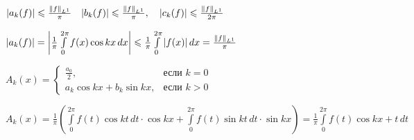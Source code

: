\begin{remark}\thmslashn
	
	$|a_k(f)| \leqslant\frac{\left\|f\right\|_{L^1}}{\pi} \quad |b_k(f)| \leqslant \frac{\left\|f\right\|_{L^1}}{\pi}, \quad |c_k(f)| \leqslant \frac{\left\|f\right\|_{L^1}}{2\pi}$
	
	$|a_k(f)| = \left| \frac{1}{\pi} \int\limits_{0}^{2\pi} f(x) \cos kx \,dx\right| \leqslant  \frac{1}{\pi} \int\limits_{0}^{2\pi} |f(x)| \,dx = \frac{\left\|f\right\|_{L^1}}{\pi}$
	
\end{remark}

\begin{designations}\thmslashn
	
	$A_k(x) = \begin{cases}
	\frac{a_0}{2}, & \text{если } k = 0\\
	a_k \cos kx + b_k \sin kx, & \text{если } k > 0
	\end{cases}$
	
\end{designations}

\begin{remark}\thmslashn
	
	$A_k(x) = \frac{1}{\pi}\left( \int\limits_{0}^{2\pi} f(t) \cos kt \,dt \cdot \cos{kx} + \int\limits_{0}^{2\pi} f(t) \sin kt \,dt \cdot \sin{kx}\right) = \frac{1}{\pi}\int\limits_{0}^{2\pi} f(t) \cos k{x + t}\,dt$ 
	
\end{remark}
